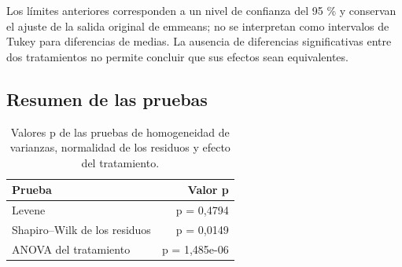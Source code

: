 \documentclass[
  spanish,
  letterpaper,
  DIV=11,
  numbers=noendperiod]{scrartcl}
\begin{document}
Los límites anteriores corresponden a un nivel de confianza del 95 \% y
conservan el ajuste de la salida original de emmeans; no se interpretan
como intervalos de Tukey para diferencias de medias. La ausencia de
diferencias significativas entre dos tratamientos no permite concluir
que sus efectos sean equivalentes.

\subsection{Resumen de las pruebas}\label{resumen-de-las-pruebas}

{

\begin{longtable}[]{@{}lr@{}}

\caption{\label{tbl-pruebas}Valores p de las pruebas de homogeneidad de
varianzas, normalidad de los residuos y efecto del tratamiento.}

\tabularnewline

\toprule\noalign{}
Prueba & Valor p \\
\midrule\noalign{}
\endhead
\bottomrule\noalign{}
\endlastfoot
Levene & p = 0,4794 \\
Shapiro--Wilk de los residuos & p = 0,0149 \\
ANOVA del tratamiento & p = 1,485e-06 \\

\end{longtable}

}
\end{document}
